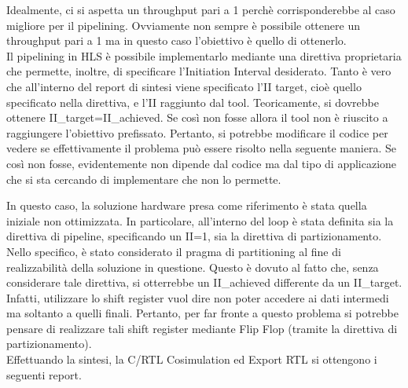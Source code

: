 Idealmente, ci si aspetta un throughput pari a 1 perchè corrisponderebbe al caso migliore per il pipelining. Ovviamente non sempre è possibile ottenere un throughput pari a 1 ma in questo caso l'obiettivo è quello di ottenerlo.
\\
Il pipelining in HLS è possibile implementarlo mediante una direttiva proprietaria che permette, inoltre, di specificare l'Initiation Interval desiderato. Tanto è vero che all'interno del report di sintesi viene specificato l'II target, cioè quello specificato nella direttiva, e l'II raggiunto dal tool. Teoricamente, si dovrebbe ottenere II\_target=II\_achieved. Se così non fosse allora il tool non è riuscito a raggiungere l'obiettivo prefissato. Pertanto, si potrebbe modificare il codice per vedere se effettivamente il problema può essere risolto nella seguente maniera. Se così non fosse, evidentemente non dipende dal codice ma dal tipo di applicazione che si sta cercando di implementare che non lo permette.



In questo caso, la soluzione hardware presa come riferimento è stata quella iniziale non ottimizzata. In particolare, all'interno del loop è stata definita sia la direttiva di pipeline, specificando un II=1, sia la direttiva di partizionamento. Nello specifico, è stato considerato il pragma di partitioning al fine di realizzabilità della soluzione in questione. Questo è dovuto al fatto che, senza considerare tale direttiva, si otterrebbe un II\_achieved differente da un II\_target. Infatti, utilizzare lo shift register vuol dire non poter accedere ai dati intermedi ma soltanto a quelli finali. Pertanto, per far fronte a questo problema si potrebbe pensare di realizzare tali shift register mediante Flip Flop (tramite la direttiva di partizionamento).
\\
Effettuando la sintesi, la C/RTL Cosimulation ed Export RTL si ottengono i seguenti report.

